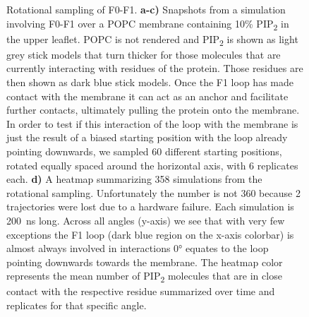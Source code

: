 \documentclass[
  twocolumn]{biophys-new-mod}
\begin{document}
\begin{figure}
\begin{minipage}[t]{\linewidth}
{{}

}

\subcaption{\label{fig-f0f1-ri-angle}~}
\end{minipage}%

\caption{\label{fig-loop-importance}Rotational sampling of F0-F1.
\textbf{a-c)} Snapshots from a simulation involving F0-F1 over a POPC
membrane containing 10\% PIP\textsubscript{2} in the upper leaflet. POPC
is not rendered and PIP\textsubscript{2} is shown as light grey stick
models that turn thicker for those molecules that are currently
interacting with residues of the protein. Those residues are then shown
as dark blue stick models. Once the F1 loop has made contact with the
membrane it can act as an anchor and facilitate further contacts,
ultimately pulling the protein onto the membrane. In order to test if
this interaction of the loop with the membrane is just the result of a
biased starting position with the loop already pointing downwards, we
sampled 60 different starting positions, rotated equally spaced around
the horizontal axis, with 6 replicates each. \textbf{d)} A heatmap
summarizing 358 simulations from the rotational sampling. Unfortunately
the number is not 360 because 2 trajectories were lost due to a hardware
failure. Each simulation is 200~ns long. Across all angles (y-axis) we
see that with very few exceptions the F1 loop (dark blue region on the
x-axis colorbar) is almost always involved in interactions 0° equates to
the loop pointing downwards towards the membrane. The heatmap color
represents the mean number of PIP\textsubscript{2} molecules that are in
close contact with the respective residue summarized over time and
replicates for that specific angle.}

\end{figure}
\end{document}
